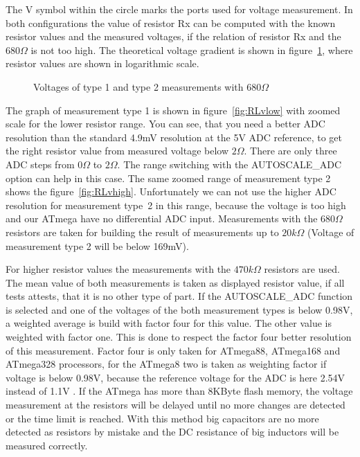 The V symbol within the circle marks the ports used for voltage measurement.
In both configurations the value of resistor Rx can be computed with the known
resistor values and the measured voltages, if the relation of resistor Rx and the \(680\Omega\) is not too high.
The theoretical voltage gradient is shown in figure~\ref{fig:RLvtot}, where resistor values are shown in logarithmic scale.
\begin{figure}[H]
\centering

\caption{Voltages of type 1 and type 2 measurements with \(680\Omega\) }
\label{fig:RLvtot}
\end{figure}
The graph of measurement type 1 is shown in figure~\ref{fig:RLvlow} with zoomed scale for the lower resistor range.
You can see, that you need a better ADC resolution than the standard 4.9mV resolution at the 5V ADC reference, to get
the right resistor value from measured voltage below \(2\Omega\).
There are only three ADC steps from \(0\Omega\) to \(2\Omega\).
The range switching with the AUTOSCALE\_ADC option can help in this case.
The same zoomed range of measurement type 2 shows the figure~\ref{fig:RLvhigh}.
Unfortunately we can not use the higher ADC resolution for measurement type~2 in this range,
 because the voltage is too high and our ATmega have no differential ADC input.
Measurements with the \(680\Omega\) resistors are taken for building the result of measurements up to \(20k\Omega\)
(Voltage of measurement type 2 will be below 169mV).

For higher resistor values the measurements with the \(470k\Omega\) resistors are used. The mean value of both
measurements is taken as displayed resistor value, if all tests attests, that it is no other type of part.
If the AUTOSCALE\_ADC function is selected and one of the voltages of the both measurement types is below 0.98V,
a weighted average is build with factor four for this value. The other value is weighted with factor one.
This is done to respect the factor four better resolution of this measurement. Factor four is only taken for ATmega88,
ATmega168 and ATmega328 processors, for the ATmega8 two is taken as weighting factor if voltage is below 0.98V,
because the reference voltage for the ADC is here 2.54V instead of 1.1V .
If the ATmega has more than 8KByte flash memory, the voltage measurement at the resistors will be delayed until
no more changes are detected or the time limit is reached.
With this method big capacitors are no more detected as resistors by mistake and
the DC resistance of big inductors will be measured correctly.


